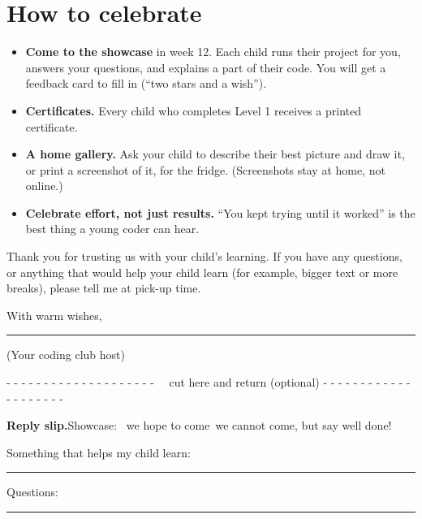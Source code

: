 \documentclass[level=1]{kidscode}
\begin{document}
\section{How to celebrate}
\begin{itemize}[itemsep=3pt]
  \item \textbf{Come to the showcase} in week 12. Each child runs their project for you, answers your
        questions, and explains a part of their code. You will get a feedback card to fill in
        (\enquote{two stars and a wish}).
  \item \textbf{Certificates.} Every child who completes Level 1 receives a printed certificate.
  \item \textbf{A home gallery.} Ask your child to describe their best picture and draw it, or
        print a screenshot of it, for the fridge. (Screenshots stay at home, not online.)
  \item \textbf{Celebrate effort, not just results.} \enquote{You kept trying until it worked} is the
        best thing a young coder can hear.
\end{itemize}

\bigskip
Thank you for trusting us with your child's learning. If you have any questions, or anything that
would help your child learn (for example, bigger text or more breaks), please tell me at pick-up time.

\bigskip
With warm wishes,\par\bigskip
\rule{6cm}{0.4pt}\par
{\small (Your coding club host)}

\vfill
\begin{center}\small\color{kcgray}
- - - - - - - - - - - - - - - - - - - - \faCut\ \ cut here and return (optional) - - - - - - - - - - - - - - - - - - - -
\end{center}
\noindent\textbf{Reply slip.}\quad Showcase: \tickbox\ we hope to come\quad \tickbox\ we cannot come, but say well done!\par\medskip
\noindent Something that helps my child learn: \rule{8.5cm}{0.4pt}\par\medskip
\noindent Questions: \rule{13cm}{0.4pt}
\end{document}
